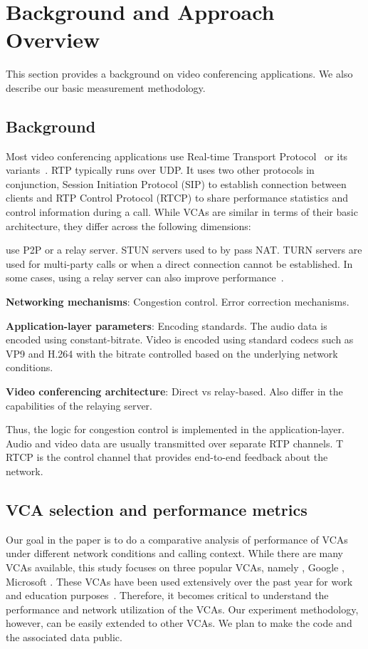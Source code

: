 \section{Background and Approach Overview}
\label{sec:background}
This section provides a background on video conferencing applications. We also describe our basic measurement methodology.

\subsection{Background}
Most video conferencing applications use Real-time Transport Protocol~\cite{schulzrinne1996rtp} or its variants~\cite{srtp, zoom}. RTP typically runs over UDP. It uses two other protocols in conjunction, Session Initiation Protocol (SIP) to establish connection between clients and RTP Control Protocol (RTCP)  to share performance statistics and control information during a call. While VCAs are similar in terms of their basic architecture, they differ across the following dimensions:

use P2P or a relay server. STUN servers used to by pass NAT. TURN servers are used for multi-party calls or when a direct connection cannot be established. In some cases, using a relay server can also improve performance~\cite{via}.

\textbf{Networking mechanisms}: Congestion control. Error correction mechanisms.

\textbf{Application-layer parameters}: Encoding standards. The audio data is encoded using constant-bitrate. Video is encoded using standard codecs such as VP9 and H.264 with the bitrate controlled based on the underlying network conditions.

\textbf{Video conferencing architecture}: Direct vs relay-based. Also differ in the capabilities of the relaying server. 




Thus, the logic for congestion control is implemented in the application-layer. Audio and video data are usually transmitted over separate RTP channels. T RTCP is the control channel that provides end-to-end feedback about the network. 



\subsection{VCA selection and performance metrics}
Our goal in the paper is to do a comparative analysis of performance of VCAs under different network conditions and calling context. While there are many VCAs available, this study focuses on three popular VCAs, namely \zoom, Google \meet, Microsoft \teams. These VCAs have been used extensively over the past year for work and education purposes~\cite{}. Therefore, it becomes critical to understand the performance and network utilization of the VCAs. Our experiment methodology, however, can be easily extended to other VCAs. We plan to make the code and the associated data public. 



